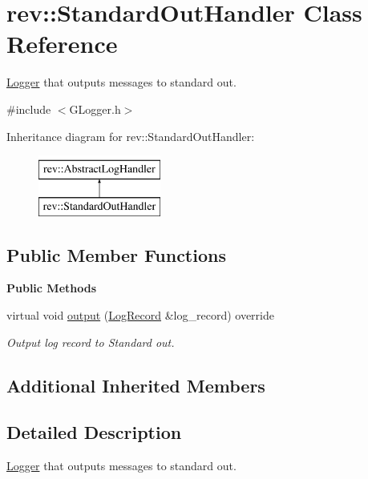 \hypertarget{classrev_1_1_standard_out_handler}{}\section{rev\+::Standard\+Out\+Handler Class Reference}
\label{classrev_1_1_standard_out_handler}


\mbox{\hyperlink{classrev_1_1_logger}{Logger}} that outputs messages to standard out.  




{\ttfamily \#include $<$G\+Logger.\+h$>$}

Inheritance diagram for rev\+::Standard\+Out\+Handler\+:\begin{figure}[H]
\begin{center}
\leavevmode
\includegraphics[height=2.000000cm]{classrev_1_1_standard_out_handler}
\end{center}
\end{figure}
\subsection*{Public Member Functions}
\begin{Indent}\textbf{ Public Methods}\par
\begin{DoxyCompactItemize}
\item 
virtual void \mbox{\hyperlink{classrev_1_1_standard_out_handler_abba7f654fa04807e85cdb9afd0f2234e}{output}} (\mbox{\hyperlink{classrev_1_1_log_record}{Log\+Record}} \&log\+\_\+record) override
\begin{DoxyCompactList}\small\item\em Output log record to Standard out. \end{DoxyCompactList}\end{DoxyCompactItemize}
\end{Indent}
\subsection*{Additional Inherited Members}


\subsection{Detailed Description}
\mbox{\hyperlink{classrev_1_1_logger}{Logger}} that outputs messages to standard out. 

